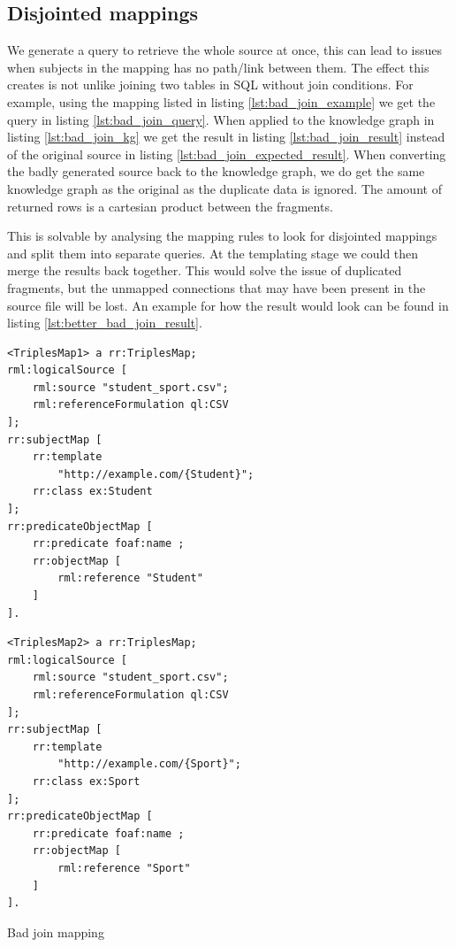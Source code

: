 \subsection{Disjointed mappings}
\label{subsection:disjointed_mappings}

We generate a query to retrieve the whole source at once, this can lead to issues when subjects in the mapping has no path/link between them. The effect this creates is not unlike joining two tables in SQL without join conditions. For example, using the mapping listed in listing \ref{lst:bad_join_example} we get the query in listing \ref{lst:bad_join_query}. When applied to the knowledge graph in listing \ref{lst:bad_join_kg} we get the result in listing \ref{lst:bad_join_result} instead of the original source in listing \ref{lst:bad_join_expected_result}. When converting the badly generated source back to the knowledge graph, we do get the same knowledge graph as the original as the duplicate data is ignored. The amount of returned rows is a cartesian product between the fragments. 

This is solvable by analysing the mapping rules to look for disjointed mappings and split them into separate queries. At the templating stage we could then merge the results back together. This would solve the issue of duplicated fragments, but the unmapped connections that may have been present in the source file will be lost. An example for how the result would look can be found in listing \ref{lst:better_bad_join_result}.

\begin{listing}[!ht]
    \noindent\begin{minipage}[b]{.49\textwidth}
        \begin{lstlisting}[basicstyle=\small, frame=single]
<TriplesMap1> a rr:TriplesMap;
rml:logicalSource [ 
    rml:source "student_sport.csv";
    rml:referenceFormulation ql:CSV
];
rr:subjectMap [ 
    rr:template 
        "http://example.com/{Student}";
    rr:class ex:Student
];
rr:predicateObjectMap [ 
    rr:predicate foaf:name ; 
    rr:objectMap [ 
        rml:reference "Student"
    ]
].
        \end{lstlisting}      
    \end{minipage}
    \hfill
    \begin{minipage}[b]{.47\textwidth}
        \begin{lstlisting}[basicstyle=\small, frame=single]
<TriplesMap2> a rr:TriplesMap;
rml:logicalSource [ 
    rml:source "student_sport.csv";
    rml:referenceFormulation ql:CSV
];
rr:subjectMap [ 
    rr:template 
        "http://example.com/{Sport}";
    rr:class ex:Sport
];
rr:predicateObjectMap [ 
    rr:predicate foaf:name ; 
    rr:objectMap [ 
        rml:reference "Sport"
    ]
].
        \end{lstlisting}
    \end{minipage}
    \addtocounter{listing}{5}
    \caption{Bad join mapping}
    \label{lst:bad_join_example}
\end{listing}

